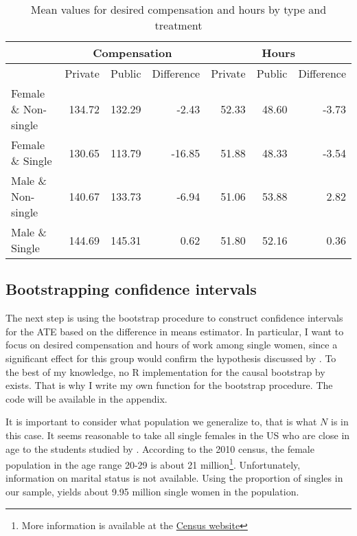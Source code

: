 \documentclass[aodsor,preprint]{imsart}
\numberwithin{equation}{section}
\theoremstyle{plain}
\begin{document}
\begin{table}[!h]
	\centering
	\caption{Mean values for desired compensation and hours by type and treatment}
	\label{mean values}
	\begin{tabular}{l|r|r|r|r|r|r|}
		\hline
		& \multicolumn{3}{c|}{Compensation} & \multicolumn{3}{|c|}{Hours} \\
		\hline
		& Private & Public & Difference & Private & Public & Difference \\
		\hline
		Female \& Non-single & 134.72 & 132.29 & -2.43 & 52.33 & 48.60 & -3.73\\
		Female \& Single & 130.65 & 113.79 & -16.85 & 51.88 & 48.33 & -3.54\\
		Male \& Non-single & 140.67 & 133.73 & -6.94 & 51.06 & 53.88 & 2.82\\
		Male \& Single & 144.69 & 145.31 & 0.62 & 51.80 & 52.16 & 0.36\\
		\hline
	\end{tabular}
\end{table}


\subsection{Bootstrapping confidence intervals}

The next step is using the bootstrap procedure to construct confidence intervals for the ATE based on the difference in means estimator. In particular, I want to focus on desired compensation and hours of work among single women, since a significant effect for this group would confirm the hypothesis discussed by \cite{Bursztyn_2017}. To the best of my knowledge, no R implementation for the causal bootstrap by \cite{Imbens_2021} exists. That is why I write my own function for the bootstrap procedure. The code will be available in the appendix.

It is important to consider what population we generalize to, that is what $N$ is in this case. It seems reasonable to take all single females in the US who are close in age to the students studied by \cite{Bursztyn_2017}. According to the 2010 census, the female population in the age range 20-29 is about 21 million\footnote{More information is available at the \href{https://www.census.gov/data/tables/time-series/demo/popest/2010s-national-detail.html}{Census website}}. Unfortunately, information on marital status is not available. Using the proportion of singles in our sample, yields about 9.95 million single women in the population.
\end{document}
